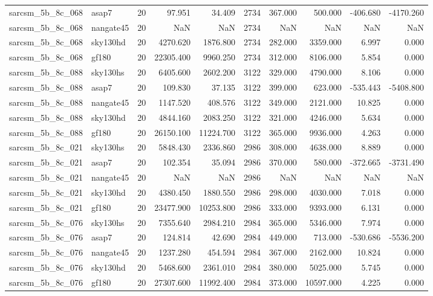 \begin{longtable}{llrrrrrrrr}
sarcsm\_5b\_8c\_068 & asap7 & 20 & 97.951 & 34.409 & 2734 & 367.000 & 500.000 & -406.680 & -4170.260 \\
sarcsm\_5b\_8c\_068 & nangate45 & 20 & NaN & NaN & 2734 & NaN & NaN & NaN & NaN \\
sarcsm\_5b\_8c\_068 & sky130hd & 20 & 4270.620 & 1876.800 & 2734 & 282.000 & 3359.000 & 6.997 & 0.000 \\
sarcsm\_5b\_8c\_068 & gf180 & 20 & 22305.400 & 9960.250 & 2734 & 312.000 & 8106.000 & 5.854 & 0.000 \\
sarcsm\_5b\_8c\_088 & sky130hs & 20 & 6405.600 & 2602.200 & 3122 & 329.000 & 4790.000 & 8.106 & 0.000 \\
sarcsm\_5b\_8c\_088 & asap7 & 20 & 109.830 & 37.135 & 3122 & 399.000 & 623.000 & -535.443 & -5408.800 \\
sarcsm\_5b\_8c\_088 & nangate45 & 20 & 1147.520 & 408.576 & 3122 & 349.000 & 2121.000 & 10.825 & 0.000 \\
sarcsm\_5b\_8c\_088 & sky130hd & 20 & 4844.160 & 2083.250 & 3122 & 321.000 & 4246.000 & 5.634 & 0.000 \\
sarcsm\_5b\_8c\_088 & gf180 & 20 & 26150.100 & 11224.700 & 3122 & 365.000 & 9936.000 & 4.263 & 0.000 \\
sarcsm\_5b\_8c\_021 & sky130hs & 20 & 5848.430 & 2336.860 & 2986 & 308.000 & 4638.000 & 8.889 & 0.000 \\
sarcsm\_5b\_8c\_021 & asap7 & 20 & 102.354 & 35.094 & 2986 & 370.000 & 580.000 & -372.665 & -3731.490 \\
sarcsm\_5b\_8c\_021 & nangate45 & 20 & NaN & NaN & 2986 & NaN & NaN & NaN & NaN \\
sarcsm\_5b\_8c\_021 & sky130hd & 20 & 4380.450 & 1880.550 & 2986 & 298.000 & 4030.000 & 7.018 & 0.000 \\
sarcsm\_5b\_8c\_021 & gf180 & 20 & 23477.900 & 10253.800 & 2986 & 333.000 & 9393.000 & 6.131 & 0.000 \\
sarcsm\_5b\_8c\_076 & sky130hs & 20 & 7355.640 & 2984.210 & 2984 & 365.000 & 5346.000 & 7.974 & 0.000 \\
sarcsm\_5b\_8c\_076 & asap7 & 20 & 124.814 & 42.690 & 2984 & 449.000 & 713.000 & -530.686 & -5536.200 \\
sarcsm\_5b\_8c\_076 & nangate45 & 20 & 1237.280 & 454.594 & 2984 & 367.000 & 2162.000 & 10.824 & 0.000 \\
sarcsm\_5b\_8c\_076 & sky130hd & 20 & 5468.600 & 2361.010 & 2984 & 380.000 & 5025.000 & 5.745 & 0.000 \\
sarcsm\_5b\_8c\_076 & gf180 & 20 & 27307.600 & 11992.400 & 2984 & 373.000 & 10597.000 & 4.225 & 0.000 \\

\end{longtable}
